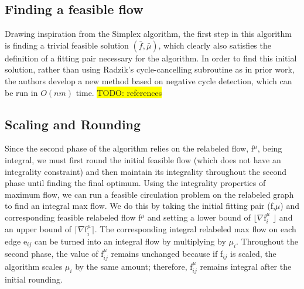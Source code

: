 \documentclass{article}
\newcommand{\todo}[1]{\colorbox{yellow}{TODO: #1}}
\begin{document}
    \subsection{Finding a feasible flow}
Drawing inspiration from the Simplex algorithm, the first step in this algorithm is finding a trivial feasible solution $(\bar{f}, \bar{\mu})$, which clearly also satisfies the definition of a fitting pair necessary for the algorithm. In order to find this initial solution, rather than using Radzik's cycle-cancelling subroutine as in prior work, the authors develop a new method based on negative cycle detection, which can be run in $O(nm)$ time. \todo{references} 
    
    \subsection{Scaling and Rounding} 
    Since the second phase of the algorithm relies on the relabeled flow, f$^\mu$, being integral, we must first round the initial feasible flow (which does not have an integrality constraint) and then maintain its integrality throughout the second phase until finding the final optimum. Using the integrality properties of maximum flow, we can run a feasible circulation problem on the relabeled graph to find an integral max flow. We do this by taking the initial fitting pair (f,$\mu$) and corresponding feasible relabeled flow f$^\mu$ and setting a lower bound of $\lfloor$$\nabla$f$_i^\mu$ $\rfloor$ and an upper bound of $\lceil$$\nabla$f$_i^\mu$$\rceil$. The corresponding integral relabeled max flow on each edge e$_{ij}$ can be turned into an integral flow by multiplying by $\mu_i$. Throughout the second phase, the value of f$_{ij}^\mu$ remains unchanged because if f$_{ij}$ is scaled, the algorithm scales $\mu_i$ by the same amount; therefore, f$_{ij}^\mu$ remains integral after the initial rounding.
    
\end{document}
